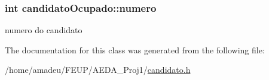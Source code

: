 \subsubsection[{\texorpdfstring{numero}{numero}}]{\setlength{\rightskip}{0pt plus 5cm}int candidato\+Ocupado\+::numero}\hypertarget{classcandidatoOcupado_a00c7bebff807b8f9bf1ff5f593e3d5da}{}\label{classcandidatoOcupado_a00c7bebff807b8f9bf1ff5f593e3d5da}


numero do candidato 



The documentation for this class was generated from the following file\+:\begin{DoxyCompactItemize}
\item 
/home/amadeu/\+F\+E\+U\+P/\+A\+E\+D\+A\+\_\+\+Proj1/\hyperlink{candidato_8h}{candidato.\+h}\end{DoxyCompactItemize}
